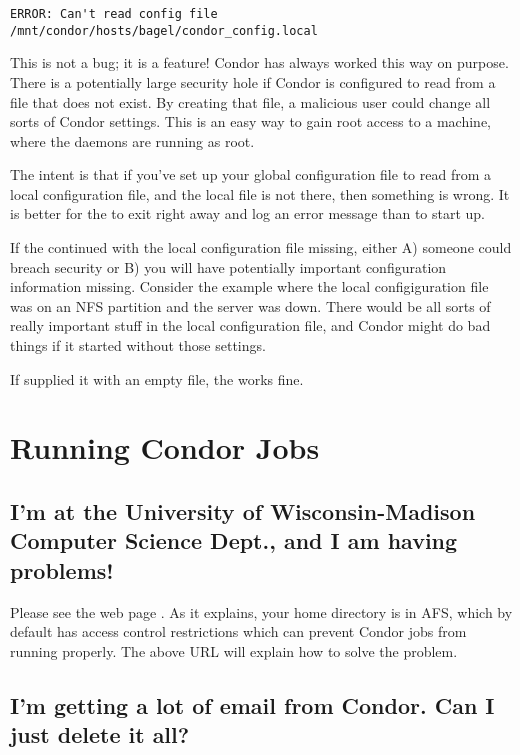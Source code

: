 \begin{verbatim}
ERROR: Can't read config file /mnt/condor/hosts/bagel/condor_config.local
\end{verbatim}

This is not a bug; it is a feature!
Condor has always worked this way on purpose.
There is a potentially
large security hole if Condor is configured to read from a file that
does not exist.
By creating that file, a malicious user could
change all sorts of Condor settings.
This is an easy way
to gain root access to a machine,
where the daemons are running as root.

The intent is that
if you've set up your global configuration file to read
from a local configuration file, and the local file is not there,
then something is wrong.
It is better for the  to exit right away and
log an error message than to start up.

If the  continued with the local configuration file
missing, either A) someone could breach security or B) you will have
potentially important configuration information missing.
Consider the example where the local configiguration file was on an NFS
partition and the server was down. 
There would be all sorts of
really important stuff in the local configuration file,
and Condor might do bad things if it started without those settings.  

If supplied it with an empty file, the  works fine.

\section{Running Condor Jobs}

\subsection{I'm at the University of Wisconsin-Madison Computer
Science Dept., and I am having problems!}

Please see the web page .
As
it explains, your home directory is in AFS, which by default has
access control restrictions which can prevent Condor jobs from running
properly.
The above URL will explain how to solve the problem.

\subsection{I'm getting a lot of email from Condor.  Can I just delete it all?}

